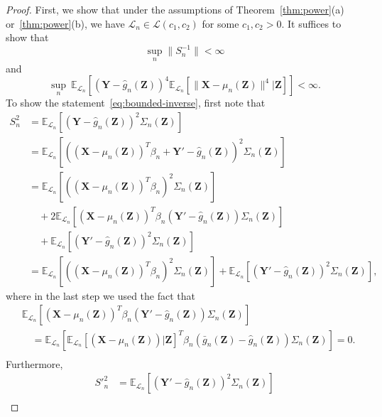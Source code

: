 \documentclass[ejs]{imsart}
\numberwithin{equation}{section}
\theoremstyle{plain}
\theoremstyle{definition}
\theoremstyle{remark}
\newcommand{\prx}{\bm X}
\newcommand{\prz}{\bm Z}
\newcommand{\pry}{{\bm Y}}
\begin{document}
\begin{proof}
First, we show that under the assumptions of Theorem~\ref{thm:power}(a) or~\ref{thm:power}(b), we have $\mathcal L_n \in \mathscr L(c_1, c_2)$ for some $c_1, c_2 > 0$. It suffices to show that
\begin{equation}
\sup_{n} \|S_n^{-1}\| < \infty
\label{eq:bounded-inverse}
\end{equation}
and
\begin{equation}
\sup_n\ \mathbb E_{\mathcal L_n}\left[(\pry - \widehat g_n(\prz))^{4} \mathbb E_{\mathcal L_n}[\|\prx - \mu_n(\prz)\|^{4}|\prz]\right] < \infty.
\label{eq:bounded-eighth-moment}
\end{equation}
To show the statement~\eqref{eq:bounded-inverse}, first note that
\begin{equation}
	\begin{split}
		S_n^2 &= \mathbb E_{\mathcal L_n}[(\pry - \widehat g_n(\prz))^2 \Sigma_n(\prz)] \\
		&=   \mathbb E_{\mathcal L_n}[((\prx - \mu_n(\prz))^T \beta_n + \pry'-\widehat g_n(\prz))^2 \Sigma_n(\prz)] \\
		&= \mathbb E_{\mathcal L_n}[((\prx - \mu_n(\prz))^T \beta_n)^2\Sigma_n(\prz)]  \\
		&\quad+2\mathbb E_{\mathcal L_n}[(\prx - \mu_n(\prz))^T \beta_n( \pry'-\widehat g_n(\prz))\Sigma_n(\prz)] \\
		&\quad + \mathbb E_{\mathcal L_n}[( \pry'-\widehat g_n(\prz))^2 \Sigma_n(\prz)] \\
		&= \mathbb E_{\mathcal L_n}[((\prx - \mu_n(\prz))^T \beta_n)^2\Sigma_n(\prz)] + \mathbb E_{\mathcal L_n}[(\pry'-\widehat g_n(\prz))^2 \Sigma_n(\prz)],
		\label{eq:s-n-2}
	\end{split}
\end{equation}
where in the last step we used the fact that
\begin{equation*}
	\begin{split}
		&\mathbb E_{\mathcal L_n}[(\prx - \mu_n(\prz))^T \beta_n( \pry'-\widehat g_n(\prz))\Sigma_n(\prz)] \\
		&\quad=\mathbb E_{\mathcal L_n}[\mathbb E_{\mathcal L_n}[(\prx - \mu_n(\prz))|\prz]^T \beta_n( \bar g_n(\prz)-\widehat g_n(\prz))\Sigma_n(\prz)] = 0. \\
	\end{split}
\end{equation*}
Furthermore, 
\begin{equation}
	\begin{split}
		S'^2_n &= \mathbb E_{\mathcal L_n}[(\pry'-\widehat g_n(\prz))^2 \Sigma_n(\prz)] \\

\end{split}
\end{equation}
\end{proof}
\end{document}
